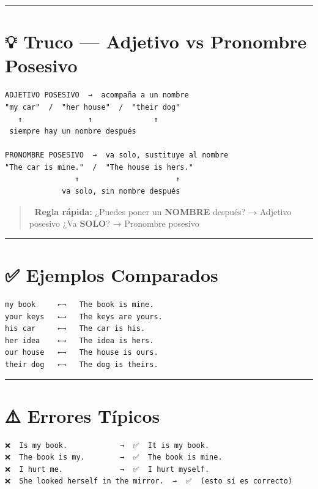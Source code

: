 \documentclass[
  spanish,
  letterpaper,
]{scrbook}
\begin{document}
\begin{center}\rule{0.5\linewidth}{0.5pt}\end{center}

\section{💡 Truco --- Adjetivo vs Pronombre
Posesivo}\label{truco-adjetivo-vs-pronombre-posesivo}

\begin{verbatim}
ADJETIVO POSESIVO  →  acompaña a un nombre
"my car"  /  "her house"  /  "their dog"
   ↑               ↑              ↑
 siempre hay un nombre después

PRONOMBRE POSESIVO  →  va solo, sustituye al nombre
"The car is mine."  /  "The house is hers."
                ↑                      ↑
             va solo, sin nombre después
\end{verbatim}

\begin{quote}
🧠 \textbf{Regla rápida:} ¿Puedes poner un \textbf{NOMBRE} después? →
Adjetivo posesivo ¿Va \textbf{SOLO}? → Pronombre posesivo
\end{quote}

\begin{center}\rule{0.5\linewidth}{0.5pt}\end{center}

\section{✅ Ejemplos Comparados}\label{ejemplos-comparados}

\begin{verbatim}
my book     ←→   The book is mine.
your keys   ←→   The keys are yours.
his car     ←→   The car is his.
her idea    ←→   The idea is hers.
our house   ←→   The house is ours.
their dog   ←→   The dog is theirs.
\end{verbatim}

\begin{center}\rule{0.5\linewidth}{0.5pt}\end{center}

\section{⚠️ Errores Típicos}\label{errores-tuxedpicos}

\begin{verbatim}
❌  Is my book.            →  ✅  It is my book.
❌  The book is my.        →  ✅  The book is mine.
❌  I hurt me.             →  ✅  I hurt myself.
❌  She looked herself in the mirror.  →  ✅  (esto sí es correcto)
\end{verbatim}
\end{document}
